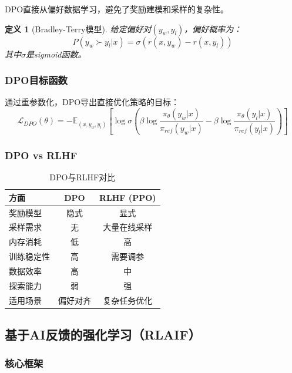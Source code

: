 \documentclass[12pt,a4paper]{article}
\newtheorem{definition}[theorem]{定义}
\begin{document}
DPO直接从偏好数据学习，避免了奖励建模和采样的复杂性。

\begin{definition}[Bradley-Terry模型]
给定偏好对$(y_w, y_l)$，偏好概率为：
\begin{equation}
P(y_w \succ y_l | x) = \sigma(r(x, y_w) - r(x, y_l))
\end{equation}
其中$\sigma$是sigmoid函数。
\end{definition}

\subsubsection{DPO目标函数}

通过重参数化，DPO导出直接优化策略的目标：
\begin{equation}
\mathcal{L}_{DPO}(\theta) = -\mathbb{E}_{(x,y_w,y_l)}\left[\log \sigma\left(\beta \log\frac{\pi_\theta(y_w|x)}{\pi_{ref}(y_w|x)} - \beta \log\frac{\pi_\theta(y_l|x)}{\pi_{ref}(y_l|x)}\right)\right]
\end{equation}

\subsubsection{DPO vs RLHF}

\begin{table}[H]
\centering
\caption{DPO与RLHF对比}
\begin{tabular}{lcc}
\toprule
\textbf{方面} & \textbf{DPO} & \textbf{RLHF (PPO)} \\
\midrule
奖励模型 & 隐式 & 显式 \\
采样需求 & 无 & 大量在线采样 \\
内存消耗 & 低 & 高 \\
训练稳定性 & 高 & 需要调参 \\
数据效率 & 高 & 中 \\
探索能力 & 弱 & 强 \\
适用场景 & 偏好对齐 & 复杂任务优化 \\
\bottomrule
\end{tabular}
\end{table}

\subsection{基于AI反馈的强化学习（RLAIF）}

\subsubsection{核心框架}
\end{document}
